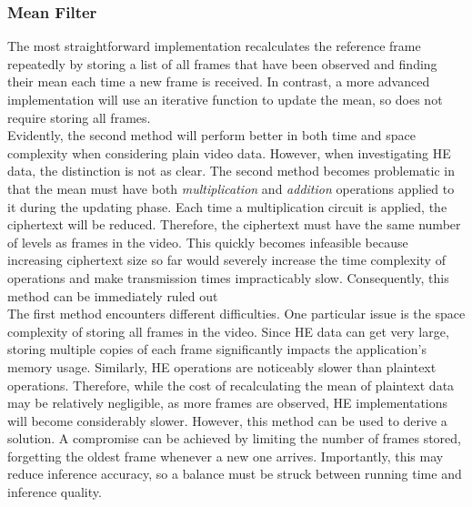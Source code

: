 \setlength{\leftskip}{0cm}
\subsubsection{Mean Filter}
\setlength{\leftskip}{0.5cm}
\indent \indent
The most straightforward implementation recalculates the reference frame repeatedly by storing a list of all frames that have been observed and finding their mean each time a new frame is received. In contrast, a more advanced implementation will use an iterative function to update the mean, so does not require storing all frames.
\smallskip \\ \indent
Evidently, the second method will perform better in both time and space complexity when considering plain video data. However, when investigating HE data, the distinction is not as clear. The second method becomes problematic in that the mean must have both \textit{multiplication} and \textit{addition} operations applied to it during the updating phase. Each time a multiplication circuit is applied, the ciphertext will be reduced. Therefore, the ciphertext must have the same number of levels as frames in the video. This quickly becomes infeasible because increasing ciphertext size so far would severely increase the time complexity of operations and make transmission times impracticably slow. Consequently, this method can be immediately ruled out
\smallskip \\ \indent
The first method encounters different difficulties. One particular issue is the space complexity of storing all frames in the video. Since HE data can get very large, storing multiple copies of each frame significantly impacts the application's memory usage. Similarly, HE operations are noticeably slower than plaintext operations. Therefore, while the cost of recalculating the mean of plaintext data may be relatively negligible, as more frames are observed, HE implementations will become considerably slower. However, this method can be used to derive a solution. A compromise can be achieved by limiting the number of frames stored, forgetting the oldest frame whenever a new one arrives. Importantly, this may reduce inference accuracy, so a balance must be struck between running time and inference quality.

\setlength{\leftskip}{0cm}
